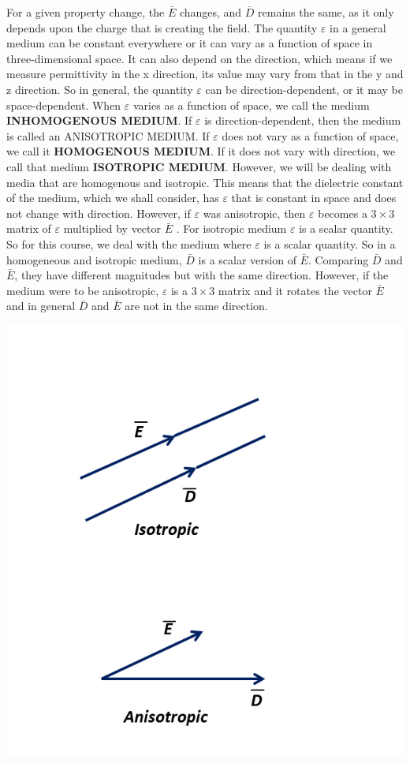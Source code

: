 \begin{mdframed}[ backgroundcolor=lightblue, linewidth=1pt, hidealllines=true]
For a given property change, the $\bar{E}$ changes, and $\bar{D}$ remains the same, as it only depends upon the charge that is creating the field. The quantity $\varepsilon$ in a general medium can be constant everywhere or it can vary as a function of space in three-dimensional space. It can also depend on the direction, which means if we measure permittivity in the x direction, its value may vary from that in the y and z direction. So in general, the quantity  $\varepsilon$  can be direction-dependent, or it may be space-dependent. When  $\varepsilon$  varies as a function of space, we call the medium \textbf{INHOMOGENOUS MEDIUM}. If  $\varepsilon$  is direction-dependent, then the medium is called an ANISOTROPIC MEDIUM. If  $\varepsilon$ does not vary as a function of space, we call it \textbf{HOMOGENOUS MEDIUM}. If it does not vary with direction, we call that medium \textbf{ISOTROPIC MEDIUM}.
However, we will be dealing with media that are homogenous and isotropic. This means that the dielectric constant of the medium, which we shall consider, has  $\varepsilon$ that is constant in space and does not change with direction. However, if  $\varepsilon$  was anisotropic, then  $\varepsilon$  becomes a $3\times 3$ matrix of  $\varepsilon$  multiplied by vector $\bar{E}$ . For isotropic medium  $\varepsilon$  is a scalar quantity. So for this course, we deal with the medium where  $\varepsilon$  is a scalar quantity.
So in a homogeneous and isotropic medium,  $\bar{D}$ is a scalar version of  $\bar{E}$. Comparing  $\bar{D}$ and  $\bar{E}$, they have different magnitudes but with the same direction. However, if the medium were to be anisotropic,  $\varepsilon$ is a $3\times 3$ matrix and it rotates the vector  $\bar{E}$ and in general  $\bar{D}$ and  $\bar{E}$ are not in the same direction.

\begin{minipage}{1\linewidth}
\centering
\includegraphics[width=0.7\linewidth]{graphics/isotropicAniso}
\label{fig:isotropicAniso}
\end{minipage}


\end{mdframed}
